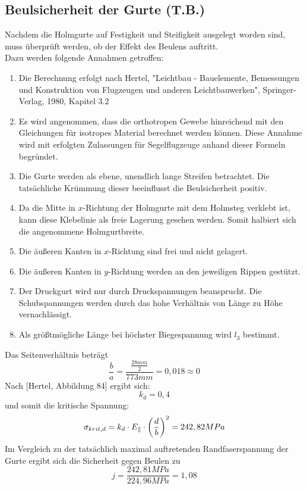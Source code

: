 \subsection{Beulsicherheit der Gurte (T.B.)}
Nachdem die Holmgurte auf Festigkeit und Steifigkeit ausgelegt worden sind, muss überprüft werden, ob der Effekt des Beulens auftritt.\\

\noindent Dazu werden folgende Annahmen getroffen:

\begin{enumerate}
	\item Die Berechnung erfolgt nach Hertel, "Leichtbau - Bauelemente, Bemessungen und Konstruktion von Flugzeugen und anderen Leichtbauwerken", Springer-Verlag, 1980, Kapitel 3.2
	\item Es wird angenommen, dass die orthotropen Gewebe hinreichend mit den Gleichungen für isotropes Material berechnet werden können. Diese Annahme wird mit erfolgten Zulassungen für Segelflugzeuge anhand dieser Formeln begründet.
	\item Die Gurte werden als ebene, unendlich lange Streifen betrachtet. Die tatsächliche Krümmung dieser beeinflusst die Beulsicherheit positiv.
	\item Da die Mitte in $x$-Richtung der Holmgurte mit dem Holmsteg verklebt ist, kann diese Klebelinie als freie Lagerung gesehen werden. Somit halbiert sich die angenommene Holmgurtbreite.
	\item Die äußeren Kanten in $x$-Richtung sind frei und nicht gelagert.
	\item Die äußeren Kanten in $y$-Richtung werden an den jeweiligen Rippen gestützt.
	\item Der Druckgurt wird nur durch Druckspannungen beansprucht. Die Schubspannungen werden durch das hohe Verhältnis von Länge zu  Höhe vernachlässigt.
	\item Als größtmögliche Länge bei höchster Biegespannung wird $l_{3}$ bestimmt.
\end{enumerate}
Das Seitenverhältnis beträgt 
\begin{equation}
	\frac{b}{a}=\frac{\frac{28 mm}{2}}{773 mm}=0,018 \approx 0
\end{equation}
\noindent Nach [Hertel, Abbildung 84] ergibt sich:
\begin{equation}
	k_{d}=0,4
\end{equation}
und somit die kritische Spannung:
\begin{equation}
	\sigma_{krit,d}=k_{d}\cdot E_{\parallel}\cdot\biggl(\frac{d}{b}\biggr)^{2}\\
	= 242,82 MPa
\end{equation}
Im Vergleich zu der tatsächlich maximal auftretenden Randfaserspannung der Gurte ergibt sich die Sicherheit gegen Beulen zu 
\begin{equation}
	j=\frac{242,81 MPa}{224,96 MPa}=1,08
\end{equation}


